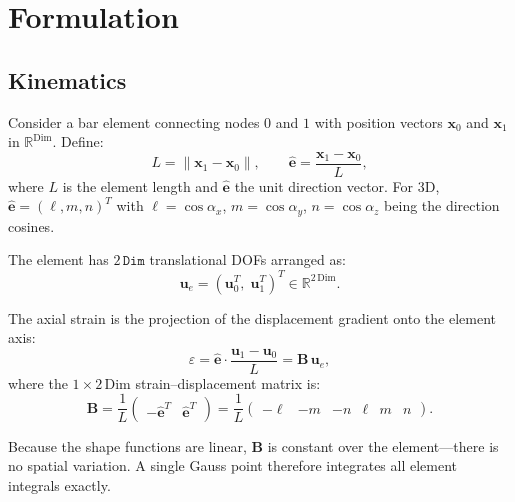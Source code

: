 \section{Formulation}
\label{sec:truss-formulation}

\subsection{Kinematics}
\label{sec:truss-kinematics}

Consider a bar element connecting nodes $0$ and $1$ with position vectors
$\mathbf{x}_0$ and $\mathbf{x}_1$ in $\mathbb{R}^{\mathrm{Dim}}$.  Define:
\begin{equation}
    L = \|\mathbf{x}_1 - \mathbf{x}_0\|, \qquad
    \hat{\mathbf{e}} = \frac{\mathbf{x}_1 - \mathbf{x}_0}{L},
    \label{eq:truss-length-dir}
\end{equation}
where $L$ is the element length and $\hat{\mathbf{e}}$ the unit direction
vector.  For 3D, $\hat{\mathbf{e}} = (\ell, m, n)^T$ with $\ell = \cos\alpha_x$,
$m = \cos\alpha_y$, $n = \cos\alpha_z$ being the direction cosines.

The element has $2\,\texttt{Dim}$ translational DOFs arranged as:
\begin{equation}
    \mathbf{u}_e = (\mathbf{u}_0^T,\; \mathbf{u}_1^T)^T \in \mathbb{R}^{2\,\mathrm{Dim}}.
    \label{eq:truss-dof-vector}
\end{equation}

The axial strain is the projection of the displacement gradient onto the
element axis:
\begin{equation}
    \varepsilon = \hat{\mathbf{e}} \cdot
    \frac{\mathbf{u}_1 - \mathbf{u}_0}{L}
    = \mathbf{B}\,\mathbf{u}_e,
    \label{eq:truss-strain}
\end{equation}
where the $1 \times 2\,\mathrm{Dim}$ strain--displacement matrix is:
\begin{equation}
    \mathbf{B} = \frac{1}{L}
    \begin{pmatrix}
        -\hat{\mathbf{e}}^T & \hat{\mathbf{e}}^T
    \end{pmatrix}
    = \frac{1}{L}
    \begin{pmatrix}
        -\ell & -m & -n & \ell & m & n
    \end{pmatrix}.
    \label{eq:truss-B-matrix}
\end{equation}

Because the shape functions are linear, $\mathbf{B}$ is constant over the
element---there is no spatial variation.  A single Gauss point therefore
integrates all element integrals exactly.


